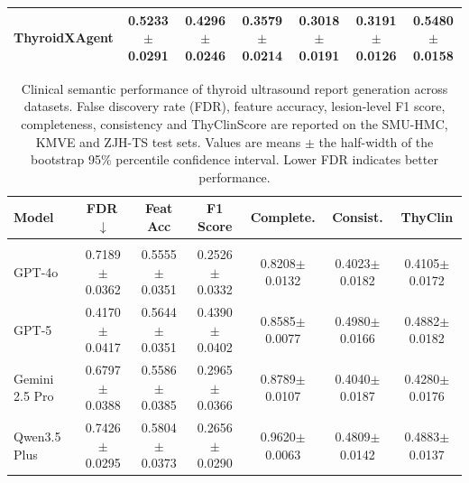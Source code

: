 \documentclass[fleqn,10pt]{wlscirep}
\begin{document}
\begin{appendices}
\begin{table}[p]
\begin{threeparttable}
\begin{tabular}{lcccccc}
\rowcolor{lightgray}
\textbf{ThyroidXAgent}
& 0.5233$\pm$0.0291
& 0.4296$\pm$0.0246
& \textbf{0.3579$\pm$0.0214}
& \textbf{0.3018$\pm$0.0191}
& 0.3191$\pm$0.0126
& \textbf{0.5480$\pm$0.0158} \\

\bottomrule
\end{tabular}

\end{threeparttable}
\end{table}
\clearpage

\begin{table}[p]
\centering
\begin{threeparttable}

\caption{Clinical semantic performance of thyroid ultrasound report generation across datasets. False discovery rate (FDR), feature accuracy, lesion-level F1 score, completeness, consistency and ThyClinScore are reported on the SMU-HMC, KMVE and ZJH-TS test sets. Values are means $\pm$ the half-width of the bootstrap 95\% percentile confidence interval. Lower FDR indicates better performance.}
\label{tab:report_generation_clinical_ci}

\footnotesize
\setlength{\tabcolsep}{5.2pt}
\renewcommand{\arraystretch}{1.04}

\begin{tabular}{lcccccc}
\toprule
\textbf{Model}
& \textbf{FDR}\,$\downarrow$
& \textbf{Feat Acc}
& \textbf{F1 Score}
& \textbf{Complete.}
& \textbf{Consist.}
& \textbf{ThyClin} \\
\midrule

\rowcolor{gray!20}
\multicolumn{7}{c}{\textbf{SMU-HMC Testset} ($n=400$)} \\

GPT-4o~\cite{openai_gpt4_2024}
& 0.7189$\pm$0.0362
& 0.5555$\pm$0.0351
& 0.2526$\pm$0.0332
& 0.8208$\pm$0.0132
& 0.4023$\pm$0.0182
& 0.4105$\pm$0.0172 \\

GPT-5~\cite{openai2025gpt5systemcard}
& 0.4170$\pm$0.0417
& 0.5644$\pm$0.0351
& 0.4390$\pm$0.0402
& 0.8585$\pm$0.0077
& 0.4980$\pm$0.0166
& 0.4882$\pm$0.0182 \\

Gemini 2.5 Pro~\cite{comanici_gemini_2025}
& 0.6797$\pm$0.0388
& 0.5586$\pm$0.0385
& 0.2965$\pm$0.0366
& 0.8789$\pm$0.0107
& 0.4040$\pm$0.0187
& 0.4280$\pm$0.0176 \\

Qwen3.5 Plus~\cite{yang_qwen3_2025}
& 0.7426$\pm$0.0295
& 0.5804$\pm$0.0373
& 0.2656$\pm$0.0290
& 0.9620$\pm$0.0063
& 0.4809$\pm$0.0142
& 0.4883$\pm$0.0137 \\


\end{tabular}
\end{threeparttable}
\end{table}
\end{appendices}
\end{document}
